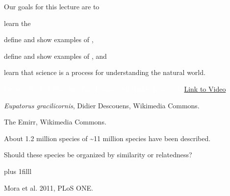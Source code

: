 \documentclass[t]{beamer}
\newcommand{\btVFill}{\vskip0pt plus 1filll}
\begin{document}

\begin{frame}[t]{Our goals for this lecture are to}

	\hangpara learn the 
	
	\hangpara define and show examples of ,
	
	\hangpara define and show examples of , and
	
	\hangpara learn that science is a process for understanding the natural world.
	
	
\end{frame}


{
\begin{frame}[b,plain]
	\Tiny\textcolor{white}{Greater Bird of Paradise \textcopyright Tim Laman, All Rights Reserved. \href{http://www.youtube.com/watch?v=KIYkpwyKEhY}{Link to Video} }
\end{frame}
}

{
\begin{frame}[b,plain]
\end{frame}
}

{
\begin{frame}[b,plain]
	\hfill\tiny \textit{Eupatorus gracilicornis}, Didier Descouens, Wikimedia Commons.
\end{frame}
}

{
\begin{frame}[b,plain]
	\tiny The Emirr, Wikimedia Commons.
\end{frame}
}


{
\begin{frame}[b,plain]{About 1.2 million species of \textasciitilde11 million species have been described.}

	\vspace*{13\baselineskip}
	
	{\large Should these species be organized by similarity or relatedness? }

	\btVFill

	\hfill\tiny Mora et al. 2011, PLoS ONE.
\end{frame}
}
\end{document}
